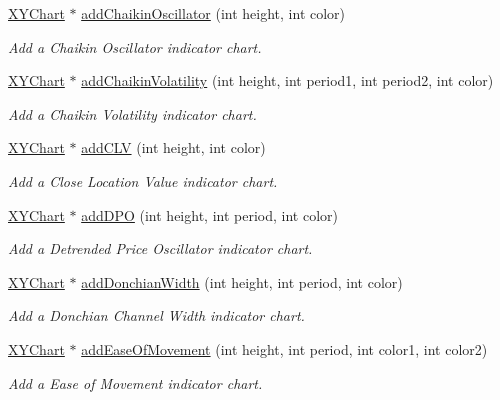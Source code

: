 \begin{DoxyCompactItemize}
\hyperlink{class_x_y_chart}{X\+Y\+Chart} $\ast$ \hyperlink{class_finance_chart_a413f41ac0d18c63ab6f3d4c4ba4baa6c}{add\+Chaikin\+Oscillator} (int height, int color)
\begin{DoxyCompactList}\small\item\em Add a Chaikin Oscillator indicator chart. \end{DoxyCompactList}\item 
\hyperlink{class_x_y_chart}{X\+Y\+Chart} $\ast$ \hyperlink{class_finance_chart_a45b334a8ddef874d6e152e347a9e725e}{add\+Chaikin\+Volatility} (int height, int period1, int period2, int color)
\begin{DoxyCompactList}\small\item\em Add a Chaikin Volatility indicator chart. \end{DoxyCompactList}\item 
\hyperlink{class_x_y_chart}{X\+Y\+Chart} $\ast$ \hyperlink{class_finance_chart_a1541d5239c097f1f35b426830d569bc8}{add\+C\+LV} (int height, int color)
\begin{DoxyCompactList}\small\item\em Add a Close Location Value indicator chart. \end{DoxyCompactList}\item 
\hyperlink{class_x_y_chart}{X\+Y\+Chart} $\ast$ \hyperlink{class_finance_chart_ad1f0a674349a991edc1cfe4197b75860}{add\+D\+PO} (int height, int period, int color)
\begin{DoxyCompactList}\small\item\em Add a Detrended Price Oscillator indicator chart. \end{DoxyCompactList}\item 
\hyperlink{class_x_y_chart}{X\+Y\+Chart} $\ast$ \hyperlink{class_finance_chart_a0cb226ad13bc836d8b5731d280e2201c}{add\+Donchian\+Width} (int height, int period, int color)
\begin{DoxyCompactList}\small\item\em Add a Donchian Channel Width indicator chart. \end{DoxyCompactList}\item 
\hyperlink{class_x_y_chart}{X\+Y\+Chart} $\ast$ \hyperlink{class_finance_chart_af821cff5482c9414a74be29646564d71}{add\+Ease\+Of\+Movement} (int height, int period, int color1, int color2)
\begin{DoxyCompactList}\small\item\em Add a Ease of Movement indicator chart. \end{DoxyCompactList}\item 

\end{DoxyCompactItemize}
